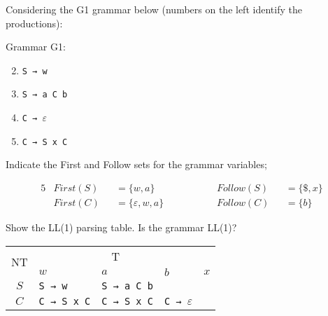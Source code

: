 \documentclass[docid=2019]{comp_exam_round2}
\begin{document}
\setcounter{chapter}{2018}

\examgroup{}

Considering the G1 grammar below (numbers on the left identify the productions):

\begin{center}
    \begin{minipage}{0.15\textwidth}
        Grammar G1:

        \begin{enumerate}
            \setcounter{enumi}{1}
            \item \texttt{S → w}
            \item \texttt{S → a C b}
            \item \texttt{C → $\varepsilon$}
            \item \texttt{C → S x C}
        \end{enumerate}
    \end{minipage}
\end{center}

\question
Indicate the First and Follow sets for the grammar variables;

\ansseparator

\vspace{-2.0em}
\begin{alignat*}{5}
    & First(S) &&= \{ w, a              \} && ~~~~~~~~~~ && Follow(S) &&= \{ \$, x \} \\
    & First(C) &&= \{ \varepsilon, w, a \} && ~~~~~~~~~~ && Follow(C) &&= \{ b     \}
\end{alignat*}
\vspace{-3.0em}

\question
Show the LL(1) parsing table. Is the grammar LL(1)?

\ansseparator

\vspace{-1em}
\begin{center}
    \small
    \begin{tabular}{@{} c | p{30mm} | p{30mm} | p{30mm} | p{30mm} @{}}
        \multirow{2}{*}{NT} & \multicolumn{3}{c}{T} \\ \cline{2-5}
            & $w$ & $a$ & $b$ & $x$ \\ \hline
        $S$ & \texttt{S → w}     & \texttt{S → a C b} & \\ \hline
        $C$ & \texttt{C → S x C} & \texttt{C → S x C} & \texttt{C → $\varepsilon$}
    \end{tabular}
\end{center}
\end{document}
